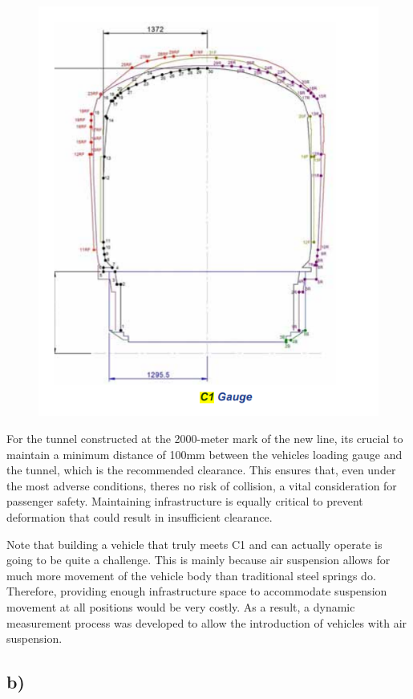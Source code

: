 \documentclass[letterpaper,12pt,leqno]{article}
\begin{document}
	\begin{figure}[H]
		\centering
		\includegraphics[width=0.8\linewidth]{figure/C1.png}
		\label{fig:C1}
	\end{figure}
	For the tunnel constructed at the 2000-meter mark of the new line,
	it\textquotesingle s crucial to maintain a minimum distance of 100mm
	between the vehicle\textquotesingle s loading gauge and the tunnel,
	which is the recommended clearance. This ensures that, even under the
	most adverse conditions, there\textquotesingle s no risk of collision, a
	vital consideration for passenger safety. Maintaining infrastructure is
	equally critical to prevent deformation that could result in
	insufficient clearance.
	
	Note that building a vehicle that truly meets C1 and can actually
	operate is going to be quite a challenge. This is mainly because air
	suspension allows for much more movement of the vehicle body than
	traditional steel springs do. Therefore, providing enough infrastructure
	space to accommodate suspension movement at all positions would be very
	costly. As a result, a dynamic measurement process was developed to
	allow the introduction of vehicles with air suspension.
	
	\subsection{b)}\label{b-2}
	
\end{document}
